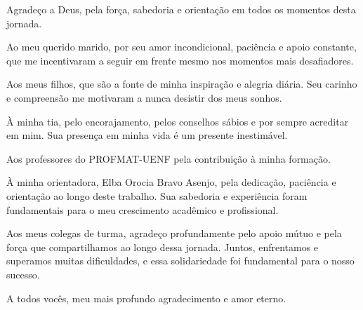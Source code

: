 
\begin{agradecimentos}
  Agradeço a Deus, pela força, sabedoria e orientação em todos os momentos desta jornada.

  Ao meu querido marido, por seu amor incondicional, paciência e apoio constante, que me incentivaram a seguir em frente mesmo nos momentos mais desafiadores.

  Aos meus filhos, que são a fonte de minha inspiração e alegria diária. Seu carinho e compreensão me motivaram a nunca desistir dos meus sonhos.

  À minha tia, pelo encorajamento, pelos conselhos sábios e por sempre acreditar em mim. Sua presença em minha vida é um presente inestimável.

  Aos professores do PROFMAT-UENF pela contribuição à minha formação.

  À minha orientadora, Elba Orocia Bravo Asenjo, pela dedicação, paciência e orientação ao longo deste trabalho. Sua sabedoria e experiência foram fundamentais para o meu crescimento acadêmico e profissional.

  Aos meus colegas de turma, agradeço profundamente pelo apoio mútuo e pela força que compartilhamos ao longo dessa jornada. Juntos, enfrentamos e superamos muitas dificuldades, e essa solidariedade foi fundamental para o nosso sucesso.

  A todos vocês, meu mais profundo agradecimento e amor eterno.

\end{agradecimentos}